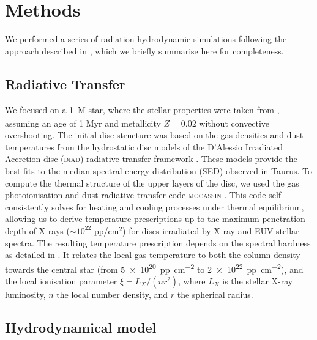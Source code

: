 \documentclass[letters,fleqn,usenatbib]{mnras}
\begin{document}
\section{Methods}\label{sec:methods}

We performed a series of radiation hydrodynamic simulations following the approach described in \citet{2019MNRAS.487..691P}, which we briefly summarise here for completeness.

\subsection{Radiative Transfer}

We focused on a \SI{1}{M_\odot} star, where the stellar properties were taken from \citet{2000A&A...358..593S}, assuming an age of 1 Myr and metallicity $Z=0.02$ without convective overshooting.
The initial disc structure was based on the gas densities and dust temperatures from the hydrostatic disc models of the D’Alessio Irradiated Accretion disc (\textsc{diad}) radiative transfer framework \citep{1998ApJ...500..411D, 1999ApJ...527..893D, 2001ApJ...553..321D, 2005ApJ...621..461D, 2006ApJ...638..314D}. These models provide the best fits to the median spectral energy distribution (SED) observed in Taurus.
To compute the thermal structure of the upper layers of the disc, we used the gas photoionisation and dust radiative transfer code \textsc{mocassin} \citep{2003MNRAS.340.1136E,2005MNRAS.362.1038E,2008ApJS..175..534E}.
This code self-consistently solves for heating and cooling processes under thermal equilibrium, allowing us to derive temperature prescriptions up to the maximum penetration depth of X-rays ($\sim 10^{22}$ pp/cm$^2$) for discs irradiated by X-ray and EUV stellar spectra.
The resulting temperature prescription depends on the spectral hardness as detailed in \citep{2021MNRAS.508.1675E}.
It relates the local gas temperature to both the column density towards the central star (from \SI{5e20}{pp.cm^{-2}} to \SI{2e22}{pp.cm^{-2}}), and the local ionisation parameter \citep{1969ApJ...156..943T} $\xi = L_X/(n r^2)$, where $L_X$ is the stellar X-ray luminosity, $n$ the local number density, and $r$ the spherical radius.

\subsection{Hydrodynamical model}
\end{document}
